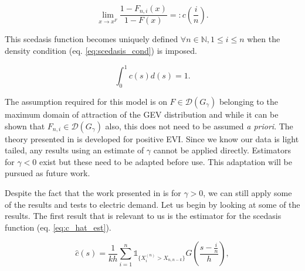 \begin{equation} \label{eq:scedasisfn}
\lim_{x \rightarrow x^F} \frac{1-F_{n,i}(x)}{1 - F(x)} =: c\left(\frac{i}{n}\right).
\end{equation}

\noindent This scedasis function becomes uniquely defined  $\forall n \in \mathbb{N}, 1 \le i \le n$ when the density condition (eq. \ref{eq:scedasis_cond}) is imposed.


\begin{equation} \label{eq:scedasis_cond}
\int_0^1 c(s)d(s) = 1.
\end{equation}

The assumption required for this model is on $F  \in \mathcal{D}(G_{\gamma})$ belonging to the maximum domain of attraction of the GEV distribution and while it can be shown that $F_{n,i}  \in \mathcal{D}(G_{\gamma})$ also, this does not need to be assumed \textit{a priori}. The theory presented in \cite{einmahl16} is developed for positive EVI. Since we know our data is light tailed, any results using an estimate of $\gamma$ cannot be applied directly. Estimators for $\gamma <0$ exist \citep{Ferreira17} but these need to be adapted before use. This adaptation will be pursued as future work. %
%

Despite the fact that the work presented in \cite{einmahl16} is for $\gamma >0$, we can still apply some of the results and tests to electric demand. Let us begin by looking at some of the results. %
The first result that is relevant to us is the estimator for the scedasis function (eq. \ref{eq:c_hat_est}).

\begin{equation} \label{eq:c_hat_est}
\hat{c}(s) = \frac{1}{kh} \sum_{i=1}^n \mathbb{1}_{\{X_i^{(n)} > X_{n,n-k}\}}G \left(\frac{s-\frac{i}{n}}{h} \right),
\end{equation}

